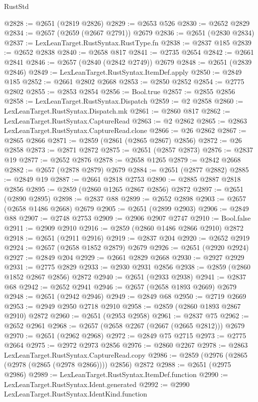 \begin{lexlean}{RustStd}
\begin{coremodule}
@2828 := @2651 (@2819 @2826)
@2829 := @2653 @526
@2830 := @2652 @2829
@2834 := @2657 (@2659 (@2667 @2791)) @2679
@2836 := @2651 (@2830 @2834)
@2837 := LexLeanTarget.RustSyntax.RustType.fn
@2838 := @2837 @185
@2839 := @2652 @2838
@2840 := @2658 @817
@2841 := @2735 @2654
@2842 := @2661 @2841
@2846 := @2657 (@2840 (@2842 @2749)) @2679
@2848 := @2651 (@2839 @2846)
@2849 := LexLeanTarget.RustSyntax.ItemDef.apply
@2850 := @2849 @185
@2852 := @2661 @2802 @2668
@2853 := @2850 @2852
@2854 := @2775 @2802
@2855 := @2853 @2854
@2856 := Bool.true
@2857 := @2855 @2856
@2858 := LexLeanTarget.RustSyntax.Dispatch
@2859 := @2 @2858
@2860 := LexLeanTarget.RustSyntax.Dispatch.mk
@2861 := @2860 @817
@2862 := LexLeanTarget.RustSyntax.CaptureRead
@2863 := @2 @2862
@2865 := @2863 LexLeanTarget.RustSyntax.CaptureRead.clone
@2866 := @26 @2862
@2867 := @2865 @2866
@2871 := @2859 (@2861 (@2865 @2867) @2856)
@2872 := @26 @2858
@2873 := @2871 @2872
@2875 := @2651 (@2857 @2873)
@2876 := @2837 @19
@2877 := @2652 @2876
@2878 := @2658 @1265
@2879 := @2842 @2668
@2882 := @2657 (@2878 @2879) @2679
@2884 := @2651 (@2877 @2882)
@2885 := @2849 @19
@2887 := @2661 @2818 @2753
@2890 := @2885 @2887 @2818 @2856
@2895 := @2859 (@2860 @1265 @2867 @2856) @2872
@2897 := @2651 (@2890 @2895)
@2898 := @2837 @88
@2899 := @2652 @2898
@2903 := @2657 (@2658 @1486 @2668) @2679
@2905 := @2651 (@2899 @2903)
@2906 := @2849 @88
@2907 := @2748 @2753
@2909 := @2906 @2907 @2747
@2910 := Bool.false
@2911 := @2909 @2910
@2916 := @2859 (@2860 @1486 @2866 @2910) @2872
@2918 := @2651 (@2911 @2916)
@2919 := @2837 @204
@2920 := @2652 @2919
@2924 := @2657 (@2658 @1852 @2879) @2679
@2926 := @2651 (@2920 @2924)
@2927 := @2849 @204
@2929 := @2661 @2829 @2668
@2930 := @2927 @2929
@2931 := @2775 @2829
@2933 := @2930 @2931 @2856
@2938 := @2859 (@2860 @1852 @2867 @2856) @2872
@2940 := @2651 (@2933 @2938)
@2941 := @2837 @68
@2942 := @2652 @2941
@2946 := @2657 (@2658 @1893 @2669) @2679
@2948 := @2651 (@2942 @2946)
@2949 := @2849 @68
@2950 := @2719 @2669
@2953 := @2949 @2950 @2718 @2910
@2958 := @2859 (@2860 @1893 @2867 @2910) @2872
@2960 := @2651 (@2953 @2958)
@2961 := @2837 @75
@2962 := @2652 @2961
@2968 := @2657 (@2658 @2267 (@2667 (@2665 @2812))) @2679
@2970 := @2651 (@2962 @2968)
@2972 := @2849 @75 @2715
@2973 := @2775 @2664
@2975 := @2972 @2973 @2856
@2976 := @2860 @2267
@2978 := @2863 LexLeanTarget.RustSyntax.CaptureRead.copy
@2986 := @2859 (@2976 (@2865 (@2978 (@2865 (@2978 @2866)))) @2856) @2872
@2988 := @2651 (@2975 @2986)
@2989 := LexLeanTarget.RustSyntax.ItemDef.function
@2990 := LexLeanTarget.RustSyntax.Ident.generated
@2992 := @2990 LexLeanTarget.RustSyntax.IdentKind.function

\end{coremodule}
\end{lexlean}
